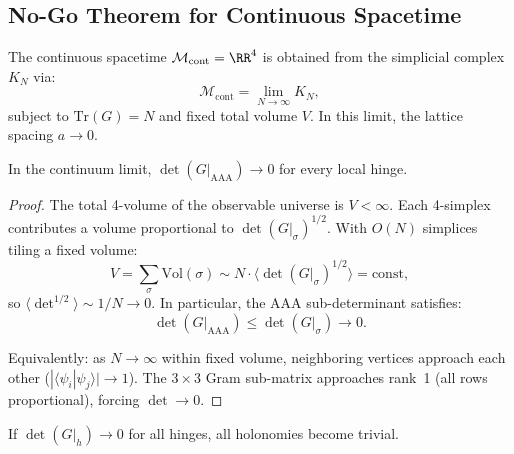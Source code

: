 \subsection{No-Go Theorem for Continuous Spacetime}
\label{sec:nogo}

\begin{definition}
\label{def:continuum}
The continuous spacetime $\mathcal{M}_{\mathrm{cont}} = \RR^4$ is
obtained from the simplicial complex $K_N$ via:
\begin{equation}
\mathcal{M}_{\mathrm{cont}} = \lim_{N \to \infty} K_N,
\end{equation}
subject to $\mathrm{Tr}(G) = N$ and fixed total volume $V$.
In this limit, the lattice spacing $a \to 0$.
\end{definition}

\begin{lemma}
\label{lem:degen}
In the continuum limit, $\det(G|_{\mathrm{AAA}}) \to 0$ for every
local hinge.
\end{lemma}

\begin{proof}
The total 4-volume of the observable universe is $V < \infty$. Each
4-simplex contributes a volume proportional to $\det(G|_\sigma)^{1/2}$.
With $O(N)$ simplices tiling a fixed volume:
\begin{equation}
V = \sum_\sigma \mathrm{Vol}(\sigma) \sim N \cdot
\langle \det(G|_\sigma)^{1/2} \rangle = \mathrm{const},
\end{equation}
so $\langle \det^{1/2} \rangle \sim 1/N \to 0$. In particular, the
AAA sub-determinant satisfies:
\begin{equation}
\det(G|_{\mathrm{AAA}}) \leq \det(G|_\sigma) \to 0.
\end{equation}

Equivalently: as $N \to \infty$ within fixed volume, neighboring
vertices approach each other ($|\langle\psi_i|\psi_j\rangle| \to 1$).
The $3 \times 3$ Gram sub-matrix approaches rank~1 (all rows
proportional), forcing $\det \to 0$.
\end{proof}

\begin{lemma}
\label{lem:fiber}
If $\det(G|_h) \to 0$ for all hinges, all holonomies become trivial.
\end{lemma}

